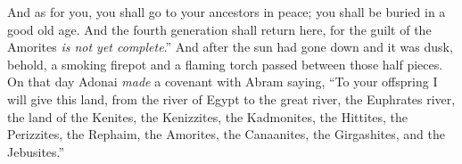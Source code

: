 \begin{biblechapter}
\verse And as for you, you shall go to your ancestors in peace; you shall be buried in a good old age.
\verse And the fourth generation shall return here, for the guilt of the Amorites \textit{is not yet complete}.”
\verse And after the sun had gone down and it was dusk, behold, a smoking firepot and a flaming torch passed between those half pieces.
\verse On that day Adonai \textit{made} a covenant with Abram saying, “To your offspring I will give this land, from the river of Egypt to the great river, the Euphrates river,
\verse the land of the Kenites, the Kenizzites, the Kadmonites,
\verse the Hittites, the Perizzites, the Rephaim,
\verse the Amorites, the Canaanites, the Girgashites, and the Jebusites.”
\end{biblechapter}

